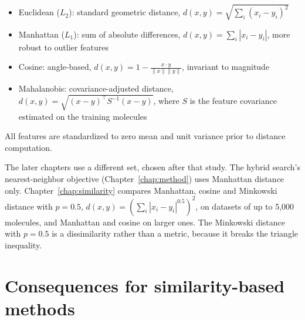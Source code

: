 \begin{itemize}
    \item Euclidean ($L_2$): standard geometric distance, $d(x, y) = \sqrt{\sum_i (x_i - y_i)^2}$
    \item Manhattan ($L_1$): sum of absolute differences, $d(x, y) = \sum_i |x_i - y_i|$, more robust to outlier features
    \item Cosine: angle-based, $d(x, y) = 1 - \frac{x \cdot y}{\|x\| \|y\|}$, invariant to magnitude
    \item Mahalanobis: covariance-adjusted distance, $d(x,y)=\sqrt{(x-y)^\top S^{-1}(x-y)}$, where $S$ is the feature covariance estimated on the training molecules \citep{Mahalanobis1936}
\end{itemize}

All features are standardized to zero mean and unit variance prior to distance computation.

The later chapters use a different set, chosen after that study. The hybrid search's nearest-neighbor objective (Chapter~\ref{chap:method}) uses Manhattan distance only. Chapter~\ref{chap:similarity} compares Manhattan, cosine and Minkowski distance with $p=0.5$, $d(x,y)=\left(\sum_i |x_i-y_i|^{0.5}\right)^{2}$, on datasets of up to 5,000 molecules, and Manhattan and cosine on larger ones. The Minkowski distance with $p=0.5$ is a dissimilarity rather than a metric, because it breaks the triangle inequality.

\section{Consequences for similarity-based methods}\label{sec:flaws:consequences}

